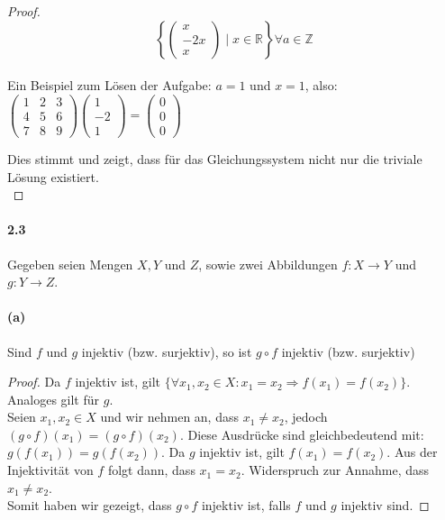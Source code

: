 \documentclass[12pt, letterpaper]{article}
\begin{document}
\begin{proof}
\[
\left\{ \begin{pmatrix} x \\ -2x \\ x \end{pmatrix} \mid x \in \mathbb{R} \right\} \forall a \in \mathbb{Z}
\]\\

\noindent Ein Beispiel zum Lösen der Aufgabe: $a = 1$ und $x = 1$, also:\\

$\begin{pmatrix}
1 & 2 & 3 \\
4 & 5 & 6 \\
7 & 8 & 9
\end{pmatrix}
\begin{pmatrix}
1 \\
-2 \\
1
\end{pmatrix}
=
\begin{pmatrix}
0 \\
0 \\
0
\end{pmatrix}$

\noindent Dies stimmt und zeigt, dass für das Gleichungssystem nicht nur die triviale Lösung existiert.\\


\end{proof}

\paragraph{2.3} Gegeben seien Mengen $X, Y$ und $Z$, sowie zwei Abbildungen $f: X \to Y$ und $g: Y \to Z$. 

\paragraph{(a)} Sind $f$ und $g$ injektiv (bzw. surjektiv), so ist $g \circ f$ injektiv (bzw. surjektiv)\\

\begin{proof}

\noindent Da $f$ injektiv ist, gilt $\{\forall x_1, x_2 \in X: x_1 = x_2 \Rightarrow f(x_1) = f(x_2)\}$. Analoges gilt für $g$.\\

\noindent Seien $x_1, x_2 \in X$ und wir nehmen an, dass $x_1 \neq x_2$, jedoch $(g \circ f)(x_1) = (g \circ f)(x_2)$. Diese Ausdrücke sind gleichbedeutend mit: $g(f(x_1)) = g(f(x_2))$. Da $g$ injektiv ist, gilt $f(x_1) = f(x_2)$. Aus der Injektivität von $f$ folgt dann, dass $x_1 = x_2$. Widerspruch zur Annahme, dass $x_1 \neq x_2$.\\

\noindent Somit haben wir gezeigt, dass $g \circ f$ injektiv ist, falls $f$ und $g$ injektiv sind.

\end{proof}
\end{document}
